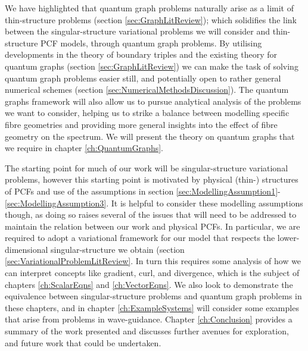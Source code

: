We have highlighted that quantum graph problems naturally arise as a limit of thin-structure problems (section \ref{sec:GraphLitReview}); which solidifies the link between the singular-structure variational problems we will consider and thin-structure PCF models, through quantum graph problems.
By utilising developments in the theory of boundary triples and the existing theory for quantum graphs (section \ref{sec:GraphLitReview}) we can make the task of solving quantum graph problems easier still, and potentially open to rather general numerical schemes (section \ref{sec:NumericalMethodsDiscussion}).
The quantum graphs framework will also allow us to pursue analytical analysis of the problems we want to consider, helping us to strike a balance between modelling specific fibre geometries and providing more general insights into the effect of fibre geometry on the spectrum.
We will present the theory on quantum graphs that we require in chapter \ref{ch:QuantumGraphs}. \newline

The starting point for much of our work will be singular-structure variational problems, however this starting point is motivated by physical (thin-) structures of PCFs and use of the assumptions in section \ref{sec:ModellingAssumption1}-\ref{sec:ModellingAssumption3}.
It is helpful to consider these modelling assumptions though, as doing so raises several of the issues that will need to be addressed to maintain the relation between our work and physical PCFs.
In particular, we are required to adopt a variational framework for our model that respects the lower-dimensional singular-structure we obtain (section \ref{sec:VariationalProblemLitReview}.
In turn this requires some analysis of how we can interpret concepts like gradient, curl, and divergence, which is the subject of chapters \ref{ch:ScalarEqns} and \ref{ch:VectorEqns}.
We also look to demonstrate the equivalence between singular-structure problems and quantum graph problems in these chapters, and in chapter \ref{ch:ExampleSystems} will consider some examples that arise from problems in wave-guidance. 
Chapter \ref{ch:Conclusion} provides a summary of the work presented and discusses further avenues for exploration, and future work that could be undertaken.